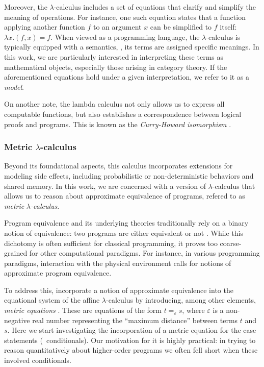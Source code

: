 Moreover, the $\lambda$-calculus includes a set of equations that clarify and simplify the meaning of operations. For instance, one such equation states that a function applying another function $f$ to an argument $x$ can be simplified to $f$ itself: $\lambda x.(f, x) = f$. When viewed as a programming language, the $\lambda$-calculus is typically equipped with a  semantics, \ie, its terms are assigned specific meanings. In this work, we are particularly interested in interpreting these terms as mathematical objects, especially those arising in category theory. If the aforementioned equations hold under a given interpretation, we refer to it as a \emph{model}.

On another note, the lambda calculus not only allows us to express all computable functions, but also establishes a correspondence between logical proofs and programs. This is known as the \emph{Curry-Howard isomorphism} \cite{girardProofsTypes1989}.




\subsubsection*{Metric $\lambda$-calculus}

Beyond its foundational aspects, this calculus incorporates extensions for modeling side effects, including probabilistic or non-deterministic behaviors and shared memory. In this work, we are concerned with a version of $\lambda$-calculus that allows us to reason about approximate equivalence of programs, refered to as \emph{metric }$\lambda$\emph{-calculus}.

Program equivalence and its underlying theories traditionally rely on a binary notion of equivalence: two programs are either equivalent or not \cite{winskel93}. While this dichotomy is often sufficient for classical programming, it proves too coarse-grained for other computational paradigms. For instance, in various programming paradigms, interaction with the physical environment calls for notions of approximate program equivalence. 

To address this, \cite{dahlqvistInternalLanguage2022,dahlqvist2023syntactic} incorporate a notion of approximate equivalence into the equational system of the affine $\lambda$-calculus by introducing, among other elements, \emph{metric equations} \cite{mardare2016quantitative, mardare2017axiomatizability}. These are equations of the form $t =_{\varepsilon} s$, where $\varepsilon$ is a non-negative real number representing the ``maximum distance'' between terms $t$ and $s$. Here we start investigating the incorporation of a metric equation for the case statements (\ie\ conditionals). Our motivation for it is highly practical: in trying to reason quantitatively about higher-order programs we often fell short when these involved conditionals.


